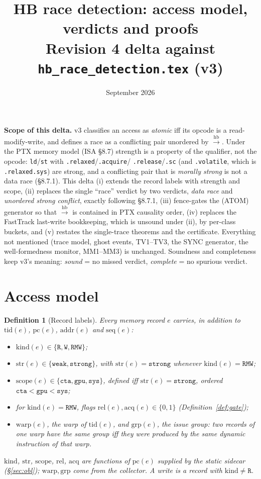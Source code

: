 \documentclass[11pt]{article}
\title{HB race detection: access model, verdicts and proofs\\
\large Revision 4 delta against \texttt{hb\_race\_detection.tex} (v3)}
\author{}
\date{September 2026}
\newtheorem{definition}{Definition}
\theoremstyle{remark}
\newcommand{\HB}{\xrightarrow{\mathrm{hb}}}
\newcommand{\tid}{\mathrm{tid}}
\newcommand{\kind}{\mathrm{kind}}
\newcommand{\str}{\mathrm{str}}
\newcommand{\scope}{\mathrm{scope}}
\newcommand{\warp}{\mathrm{warp}}
\newcommand{\grp}{\mathrm{grp}}
\newcommand{\rel}{\mathrm{rel}}
\newcommand{\acq}{\mathrm{acq}}
\newcommand{\seq}{\mathrm{seq}}
\begin{document}
\maketitle

\noindent\textbf{Scope of this delta.}
v3 classifies an access as \emph{atomic} iff its opcode is a read-modify-write,
and defines a race as a conflicting pair unordered by $\HB$. Under the PTX
memory model (ISA \S8.7) strength is a property of the qualifier, not the
opcode: \texttt{ld}/\texttt{st} with \texttt{.relaxed}/\texttt{.acquire}/%
\texttt{.release}/\texttt{.sc} (and \texttt{.volatile}, which is
\texttt{.relaxed.sys}) are strong, and a conflicting pair that is \emph{morally
strong} is not a data race (\S8.7.1). This delta (i) extends the record
labels with strength and scope, (ii) replaces the single ``race'' verdict by
two verdicts, \emph{data race} and \emph{unordered strong conflict}, exactly
following \S8.7.1, (iii) fence-gates the (ATOM) generator so that $\HB$ is
contained in PTX causality order, (iv) replaces the FastTrack last-write
bookkeeping, which is unsound under (ii), by per-class buckets, and (v)
restates the single-trace theorems and the certificate. Everything not
mentioned (trace model, ghost events, TV1--TV3, the SYNC generator, the
well-formedness monitor, MM1--MM3) is unchanged. Soundness and completeness
keep v3's meaning: \emph{sound} = no missed verdict, \emph{complete} = no
spurious verdict.

\section{Access model}

\begin{definition}[Record labels]\label{def:labels}
Every memory record $e$ carries, in addition to $\tid(e)$, $\mathrm{pc}(e)$,
$\mathrm{addr}(e)$ and $\seq(e)$:
\begin{itemize}[nosep]
\item $\kind(e)\in\{\mathtt{R},\mathtt{W},\mathtt{RMW}\}$;
\item $\str(e)\in\{\mathtt{weak},\mathtt{strong}\}$, with
      $\str(e)=\mathtt{strong}$ whenever $\kind(e)=\mathtt{RMW}$;
\item $\scope(e)\in\{\mathtt{cta},\mathtt{gpu},\mathtt{sys}\}$, defined iff
      $\str(e)=\mathtt{strong}$, ordered $\mathtt{cta}<\mathtt{gpu}<\mathtt{sys}$;
\item for $\kind(e)=\mathtt{RMW}$, flags $\rel(e),\acq(e)\in\{0,1\}$
      (Definition~\ref{def:gate});
\item $\warp(e)$, the warp of $\tid(e)$, and $\grp(e)$, the issue group: two
      records of one warp have the same group iff they were produced by the
      same dynamic instruction of that warp.
\end{itemize}
$\kind$, $\str$, $\scope$, $\rel$, $\acq$ are functions of $\mathrm{pc}(e)$
supplied by the static sidecar (\S\ref{sec:obl}); $\warp,\grp$ come from the
collector. A \emph{write} is a record with $\kind\ne\mathtt{R}$.
\end{definition}
\end{document}
